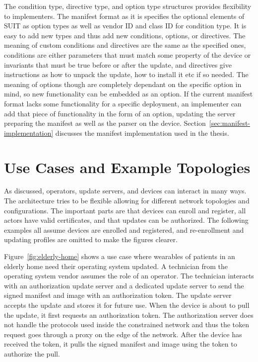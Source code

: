 \documentclass[0-thesis.tex]{subfiles}
\begin{document}
The condition type, directive type, and option type structures provides flexibility to
implementers. The manifest format as it is specifies the optional elements of SUIT as
option types as well as vendor ID and class ID for condition type. It is easy to add new
types and thus add new conditions, options, or directives. The meaning of custom
conditions and directives are the same as the specified ones, conditions are either
parameters that must match some property of the device or invariants that must be true
before or after the update, and directives give instructions as how to unpack the update,
how to install it etc if so needed. The meaning of options though are completely dependant
on the specific option in mind, so new functionality can be embedded as an option. If the
current manifest format lacks some functionality for a specific deployment, an implementer
can add that piece of functionality in the form of an option, updating the server
preparing the manifest as well as the parser on the device.
Section~\ref{sec:manifest-implementation} discusses the manifest implementation used in
the thesis.

\section{Use Cases and Example Topologies}
\label{sec:use-cases-examples-topologies}
As discussed, operators, update servers, and devices can interact in many ways. The
architecture tries to be flexible allowing for different network topologies and
configurations. The important parts are that devices can enroll and register, all actors
have valid certificates, and that updates can be authorized. The following examples all
assume devices are enrolled and registered, and re-enrollment and updating profiles are
omitted to make the figures clearer.

Figure~\ref{fig:elderly-home} shows a use case where wearables of patients in an elderly
home need their operating system updated. A technician from the operating system vendor
assumes the role of an operator. The technician interacts with an authorization update
server and a dedicated update server to send the signed manifest and image with an
authorization token. The update server accepts the update and stores it for future use.
When the device is about to pull the update, it first requests an authorization token. The
authorization server does not handle the protocols used inside the constrained network and
thus the token request goes through a proxy on the edge of the network. After the device
has received the token, it pulls the signed manifest and image using the token to
authorize the pull.
\end{document}

